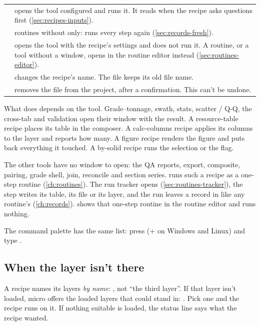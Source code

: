 \begin{tabularx}{\linewidth}{@{}lL@{}}\toprule
{} & opens the tool configured and runs it. It reads  when the recipe asks questions first (\cref{sec:recipes-inputs}). \\
 & routines without  only: runs every step again (\cref{sec:records-fresh}). \\
 & opens the tool with the recipe's settings and does not run it. A routine, or a tool without a window, opens in the routine editor instead (\cref{sec:routines-editor}). \\
 & changes the recipe's name. The file keeps its old file name. \\
 & removes the file from the project, after a confirmation. This can't be undone. \\
\bottomrule
\end{tabularx}

What  does depends on the tool. Grade–tonnage, swath, stats, scatter / Q-Q, the cross-tab and validation open their window with the result. A resource-table recipe places its table in the composer. A calc-columns recipe applies its columns to the layer and reports how many. A figure recipe renders the figure and puts back everything it touched. A by-solid recipe runs the selection or the flag.

The other tools have no window to open: the QA reports, export, composite, pairing, grade shell, join, reconcile and section series.  runs such a recipe as a one-step routine (\cref{ch:routines}). The run tracker opens (\cref{sec:routines-tracker}), the step writes its table, its file or its layer, and the run leaves a record in  like any routine's (\cref{ch:records}).  shows that one-step routine in the routine editor and runs nothing.

The command palette has the same list: press  (+ on Windows and Linux) and type .

\subsection{When the layer isn't there}
A recipe names its layers \emph{by name}: , not ``the third layer''. If that layer isn't loaded, micro offers the loaded layers that could stand in: . Pick one and the recipe runs on it. If nothing suitable is loaded, the status line says what the recipe wanted.

